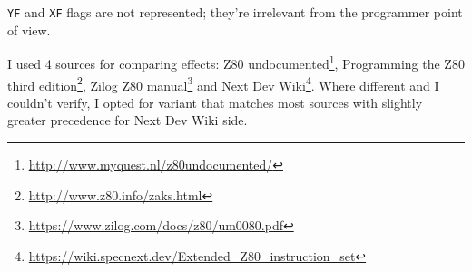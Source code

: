 {\tt YF} and {\tt XF} flags are not represented; they're irrelevant from the programmer point of view.
	
I used 4 sources for comparing effects: Z80 undocumented\footnote{\url{http://www.myquest.nl/z80undocumented/}}, Programming the Z80 third edition\footnote{\url{http://www.z80.info/zaks.html}}, Zilog Z80 manual\footnote{\url{https://www.zilog.com/docs/z80/um0080.pdf}} and Next Dev Wiki\footnote{\url{https://wiki.specnext.dev/Extended_Z80_instruction_set}}. Where different and I couldn't verify, I opted for variant that matches most sources with slightly greater precedence for Next Dev Wiki side.


\pagebreak

















